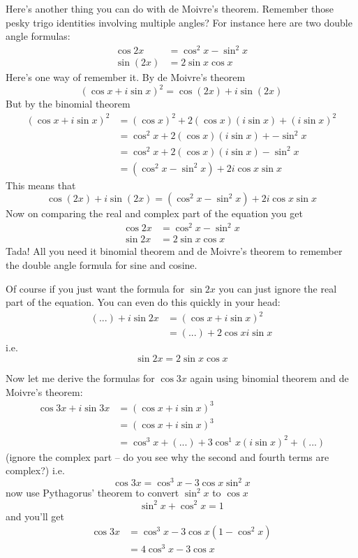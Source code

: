 Here's another thing you can do with de Moivre's theorem.
Remember those pesky trigo identities involving multiple angles?
For instance here are two double angle formulas:
\begin{align*}
  \cos 2x &= \cos^2 x - \sin^2 x \\
  \sin(2x) &= 2 \sin x \cos x
\end{align*}
Here's one way of remember it.
By de Moivre's theorem
\[
(\cos x + i \sin x)^2 = \cos (2x) + i \sin (2x)
\]
But by the binomial theorem
\begin{align*}
(\cos x + i \sin x)^2 
&= (\cos x)^2 + 2 (\cos x)(i \sin x) + (i \sin x)^2 \\
&= \cos^2 x + 2 (\cos x)(i \sin x) + - \sin^2 x \\
&= \cos^2 x + 2 (\cos x)(i \sin x) - \sin^2 x \\
&= (\cos^2 x - \sin^2 x) + 2 i \cos x \sin x
\end{align*}
This means that
\[
\cos (2x) + i \sin (2x)
= (\cos^2 x - \sin^2 x) + 2 i \cos x \sin x 
\]
Now on comparing the real and complex part of the equation you get
\begin{align*}
\cos 2x &= \cos^2 x - \sin^2 x \\
\sin 2x &= 2 \sin x \cos x 
\end{align*}
Tada!
All you need it binomial theorem and de Moivre's theorem
to remember the double angle formula for sine and cosine.

Of course if you just want the formula for $\sin 2x$ you can 
just ignore the real part of the equation.
You can even do this quickly in your head:
\begin{align*}
(...) + i \sin 2x 
&= (\cos x + i \sin x)^2 \\
&= (...) + 2 \cos x i \sin x
\end{align*}
i.e.
\[
\sin 2x = 2 \sin x \cos x
\]

Now let me derive the formulas for $\cos 3x$
again using binomial theorem and de Moivre's theorem:
\begin{align*}
\cos 3x + i \sin 3x
&= (\cos x + i \sin x)^3 \\
&= (\cos x + i \sin x)^3 \\
&= \cos^3 x + (...) + 3\cos^1 x (i\sin x)^2 + (...)
\end{align*}
(ignore the complex part -- do you see why the second and fourth
terms are complex?)
i.e.
\[
\cos 3x = \cos^3 x - 3\cos x \sin^2 x
\]
now use Pythagorus' theorem to convert $\sin^2 x$ to $\cos x$
\[
\sin^2 x + \cos^2 x = 1
\]
and you'll get
\begin{align*}
\cos 3x
&= \cos^3 x - 3\cos x (1-\cos^2 x) \\
&= 4\cos^3 x - 3 \cos x
\end{align*}

